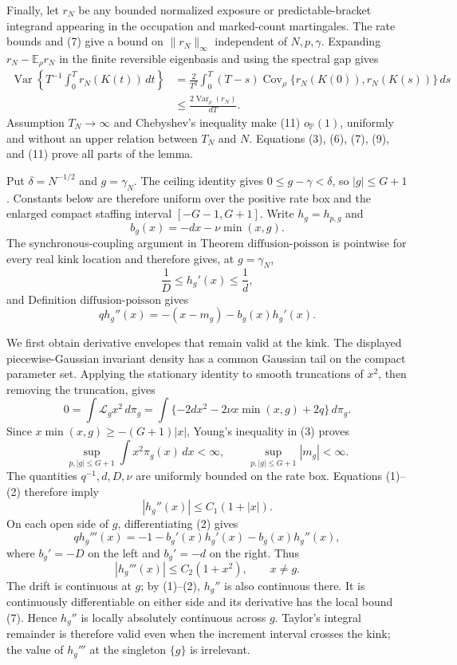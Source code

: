 Finally, let \(r_N\) be any bounded normalized exposure or predictable-bracket integrand appearing in the occupation and marked-count martingales.  The rate bounds and (7) give a bound on \(\|r_N\|_\infty\) independent of \(N,p,\gamma\).  Expanding \(r_N-\mathbb E_\rho r_N\) in the finite reversible eigenbasis and using the spectral gap gives
\[
 \begin{split}
 \operatorname{Var}\!\left\{T^{-1}\int_0^T r_N(K(t))\,dt\right\}
 &=\frac2{T^2}\int_0^T(T-s)
   \operatorname{Cov}_\rho\{r_N(K(0)),r_N(K(s))\}\,ds\\
 &\leq\frac{2\operatorname{Var}_\rho(r_N)}{dT}.               \tag{11}
 \end{split}
\]
Assumption \(T_N\to\infty\) and Chebyshev's inequality make (11) \(o_{\mathbb P}(1)\), uniformly and without an upper relation between \(T_N\) and \(N\).  Equations (3), (6), (7), (9), and (11) prove all parts of the lemma.

Put \(\delta=N^{-1/2}\) and \(g=\gamma_N\).  The ceiling identity gives \(0\leq g-\gamma<\delta\), so \(|g|\leq G+1\).  Constants below are therefore uniform over the positive rate box and the enlarged compact staffing interval \([-G-1,G+1]\).  Write \(h_g=h_{p,g}\) and
\[
 b_g(x)=-dx-\nu\min(x,g).
\]
The synchronous-coupling argument in Theorem \(\mathrm{diffusion\mbox{-}poisson}\) is pointwise for every real kink location and therefore gives, at \(g=\gamma_N\),
\[
 \frac1D\leq h_g'(x)\leq\frac1d,                              \tag{1}
\]
and Definition \(\mathrm{diffusion\mbox{-}poisson}\) gives
\[
 qh_g''(x)=-(x-m_g)-b_g(x)h_g'(x).                             \tag{2}
\]

We first obtain derivative envelopes that remain valid at the kink.  The displayed piecewise-Gaussian invariant density has a common Gaussian tail on the compact parameter set.  Applying the stationary identity to smooth truncations of \(x^2\), then removing the truncation, gives
\[
 0=\int\mathcal L_gx^2\,d\pi_g
 =\int\{-2dx^2-2\nu x\min(x,g)+2q\}\,d\pi_g.                 \tag{3}
\]
Since \(x\min(x,g)\geq-(G+1)|x|\), Young's inequality in (3) proves
\[
 \sup_{p,|g|\leq G+1}\int x^2\pi_g(x)\,dx<\infty,
 \qquad
 \sup_{p,|g|\leq G+1}|m_g|<\infty.                            \tag{4}
\]
The quantities \(q^{-1},d,D,\nu\) are uniformly bounded on the rate box.  Equations (1)--(2) therefore imply
\[
 |h_g''(x)|\leq C_1(1+|x|).                                   \tag{5}
\]
On each open side of \(g\), differentiating (2) gives
\[
 qh_g'''(x)=-1-b_g'(x)h_g'(x)-b_g(x)h_g''(x),                 \tag{6}
\]
where \(b_g'=-D\) on the left and \(b_g'=-d\) on the right.  Thus
\[
 |h_g'''(x)|\leq C_2(1+x^2),\qquad x\ne g.                    \tag{7}
\]
The drift is continuous at \(g\); by (1)--(2), \(h_g''\) is also continuous there.  It is continuously differentiable on either side and its derivative has the local bound (7).  Hence \(h_g''\) is locally absolutely continuous across \(g\).  Taylor's integral remainder is therefore valid even when the increment interval crosses the kink; the value of \(h_g'''\) at the singleton \(\{g\}\) is irrelevant.

